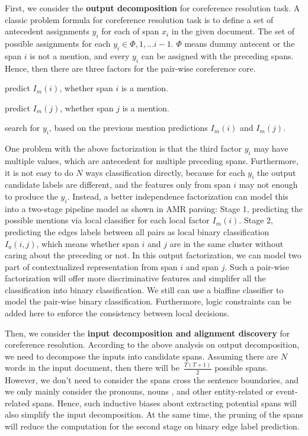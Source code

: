 First, we consider the \textbf{output decomposition} for coreference
resolution task.  A classic problem formula for coreference resolution
task is to define a set of antecedent assignments $y_{i}$ for each of
span $x_{i}$ in the given document. The set of possible assignments
for each $y_{i} \in {\Phi, 1,...i-1}$. $\Phi$ means dummy antecent or the span
$i$ is not a mention, and every $y_{i}$ can be assigned with the
preceding spans.  Hence, then there are three factors for the
pair-wise coreference core.
\begin{inparaenum}[(1)]
\item predict $I_{m}(i)$, whether span $i$ is a mention.
\item predict $I_{m}(j)$, whether span $j$ is a mention.
\item search for $y_{i}$, based on the previous mention predictions
  $I_{m}(i)$ and $I_{m}(j)$.
\end{inparaenum}
One problem with the above factorization is that the third factor
$y_{i}$ may have multiple values, which are antecedent for multiple
preceding spans. Furthermore, it is not easy to do $N$ ways
classification directly, because for each $y_{i}$ the output candidate
labels are different, and the features only from span $i$ may not
enough to produce the $y_{i}$. Instead, a better independence
factorization can model this into a two-stage pipeline model as shown
in AMR parsing: Stage 1, predicting the possible mentions via local
classifier for each local factor $I_{m}(i)$. Stage 2, predicting the
edges labels between all pairs as local binary classification
$I_{a}(i,j)$, which means whether span $i$ and $j$ are in the same
cluster without caring about the preceding or not. In this output
factorization, we can model two part of contextualized representation
from span $i$ and span $j$. Such a pair-wise factorization will offer
more discriminative features and simplifer all the classification into
binary classification.  We still can use a biaffine classifier to
model the pair-wise binary classification. Furthermore, logic
constraints can be added here to enforce the consistency between local
decisions.

Then, we consider the \textbf{input decomposition and alignment
  discovery} for coreference resolution. According to the above
analysis on output decomposition, we need to decompose the inputs into
candidate spans. Assuming there are $N$ words in the input document,
then there will be~$\frac{T(T+1)}{2}$ possible spans. However, we
don't need to consider the spans cross the sentence boundaries, and we
only mainly consider the pronouns, nouns , and other entity-related or
event-related spans. Hence, such inductive biases about extracting
potential spans will also simplify the input decomposition. At the
same time, the pruning of the spans will reduce the computation for
the second stage on binary edge label prediction.

